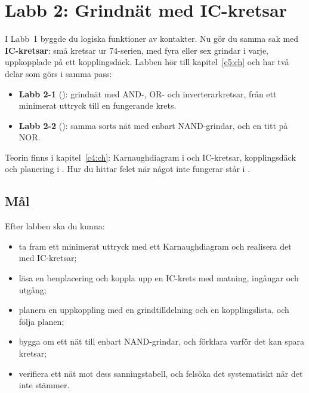 %
%

\makeatletter
\providecommand{\labprep}[3][]{\prep{#2\if\relax\detokenize{#1}\relax\else\ -- #1\fi}%
  \phantomsection\def\@currentlabel{#2}\label{#3}}
\makeatother

\chapter{Labb 2: Grindnät med IC-kretsar}
\label{app:lab2}

I Labb~1 byggde du logiska funktioner av kontakter. Nu gör du samma sak med \textbf{IC-kretsar}:
små kretsar ur 74-serien, med fyra eller sex grindar i varje, uppkopplade på ett kopplingsdäck.
Labben hör till kapitel~\ref{c5:ch} och har två delar som görs i samma pass:
\begin{itemize}
  \item \textbf{Labb 2-1} (): grindnät med AND-, OR- och inverterarkretsar, från ett
    minimerat uttryck till en fungerande krets.
  \item \textbf{Labb 2-2} (): samma sorts nät med enbart NAND-grindar, och en titt
    på NOR.
\end{itemize}

Teorin finns i kapitel~\ref{c4:ch}: Karnaughdiagram i  och IC-kretsar,
kopplingsdäck och planering i . Hur du hittar felet när något inte fungerar står
i .

\section{Mål}
\label{lab2:sec:goals}
Efter labben ska du kunna:
\begin{itemize}
  \item ta fram ett minimerat uttryck med ett Karnaughdiagram och realisera det med IC-kretsar;
  \item läsa en benplacering och koppla upp en IC-krets med matning, ingångar och utgång;
  \item planera en uppkoppling med en grindtilldelning och en kopplingslista, och följa planen;
  \item bygga om ett nät till enbart NAND-grindar, och förklara varför det kan spara kretsar;
  \item verifiera ett nät mot dess sanningstabell, och felsöka det systematiskt när det inte
    stämmer.
\end{itemize}

